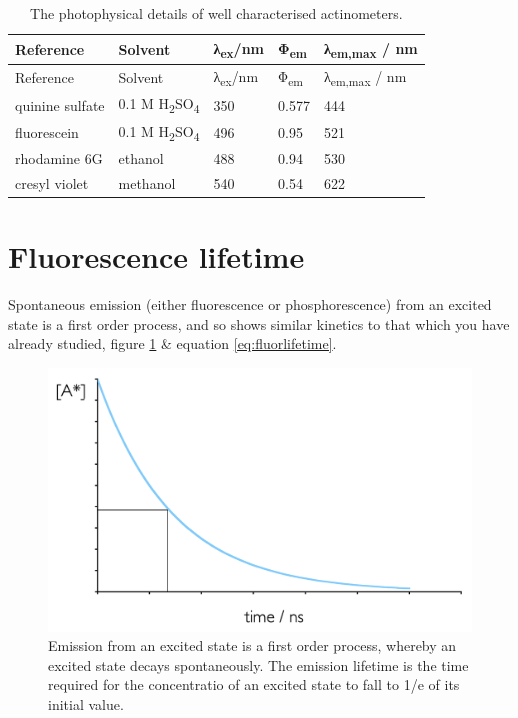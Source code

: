 \documentclass[
]{book}
\begin{document}
\begin{longtable}[]{@{}lllll@{}}
\caption{\label{tab:actinometer} The photophysical details of well characterised actinometers.}\tabularnewline
\toprule()
Reference & Solvent & λ\textsubscript{ex}/nm & Φ\textsubscript{em} & λ\textsubscript{em,max} / nm \\
\midrule()
\endfirsthead
\toprule()
Reference & Solvent & λ\textsubscript{ex}/nm & Φ\textsubscript{em} & λ\textsubscript{em,max} / nm \\
\midrule()
\endhead
quinine sulfate & 0.1 M H\textsubscript{2}SO\textsubscript{4} & 350 & 0.577 & 444 \\
fluorescein & 0.1 M H\textsubscript{2}SO\textsubscript{4} & 496 & 0.95 & 521 \\
rhodamine 6G & ethanol & 488 & 0.94 & 530 \\
cresyl violet & methanol & 540 & 0.54 & 622 \\
\bottomrule()
\end{longtable}

\hypertarget{fluorescence-lifetime}{%
\section{Fluorescence lifetime}\label{fluorescence-lifetime}}

Spontaneous emission (either fluorescence or phosphorescence) from an excited state is a first order process, and so shows similar kinetics to that which you have already studied, figure \ref{fig:fluorlifetime} \& equation \eqref{eq:fluorlifetime}.

\begin{figure}

{\centering \includegraphics[width=0.5\linewidth]{images/fluorlifetime} 

}

\caption{Emission from an excited state is a first order process, whereby an excited state decays spontaneously. The emission lifetime is the time required for the concentratio of an excited state to fall to 1/e of its initial value.}\label{fig:fluorlifetime}
\end{figure}
\end{document}
